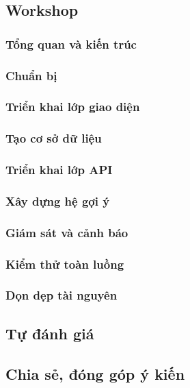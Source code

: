 \subsection{Workshop}

\subsubsection{Tổng quan và kiến trúc}


\subsubsection{Chuẩn bị}


\subsubsection{Triển khai lớp giao diện}


\subsubsection{Tạo cơ sở dữ liệu}


\subsubsection{Triển khai lớp API}


\subsubsection{Xây dựng hệ gợi ý}


\subsubsection{Giám sát và cảnh báo}


\subsubsection{Kiểm thử toàn luồng}


\subsubsection{Dọn dẹp tài nguyên}


\newpage

\subsection{Tự đánh giá}



\newpage

\subsection{Chia sẻ, đóng góp ý kiến}



\newpage

